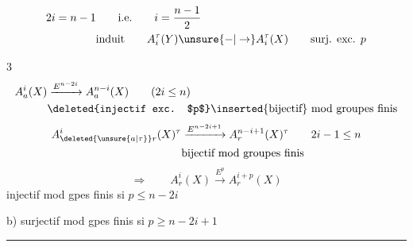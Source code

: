 \[
\begin{aligned}
 2i=n-1&\qquad\text{i.e.}\qquad i=\frac{n-1}2\\
 &\text{induit}\qquad A_i^\tau(Y)\unsure{\mathord{-}|\to} A_i^\tau(X)\qquad\text{surj. exc. $p$}
\end{aligned}
\]

\textcircled{3}
\[
\begin{aligned}
 A_a^i(X)&\xrightarrow{E^{n-2i}} A_a^{n-i}(X)\qquad(2i\leq n)\\
 &\text{\deleted{injectif exc. $p$}\inserted{bijectif} mod groupes finis}
\end{aligned}
\]
\[
\begin{aligned}
 A^i_{\deleted{\unsure{a|\tau}}r}(X)^\tau
 &\xrightarrow{E^{n-2i+1}} A_r^{n-i+1}(X)^\tau\qquad 2i-1\leq n\\
 &\text{bijectif mod groupes finis}
\end{aligned}
\]
\[
 \Longrightarrow\qquad A^i_r(X)\xrightarrow{E^p}A^{i+p}_r(X)
\]
 injectif mod gpes finis si $p\leq n-2i$

b) surjectif mod gpes finis si $p\geq n-2i+1$

\noindent\rule{\linewidth}{0.35pt}

